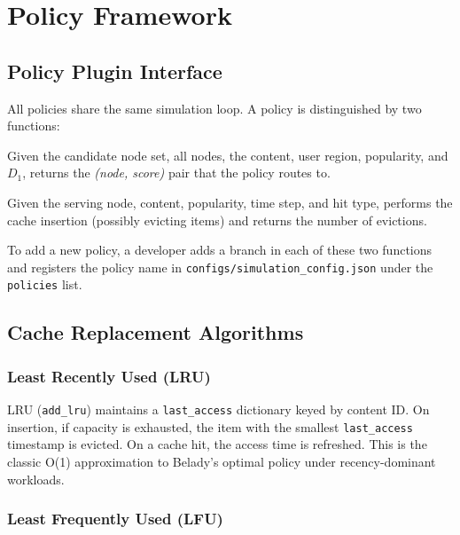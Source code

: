 \documentclass[12pt]{article}
\begin{document}
\section{Policy Framework}
\label{sec:policies}

\subsection{Policy Plugin Interface}

All policies share the same simulation loop. A policy is distinguished by two functions:

\begin{description}[noitemsep]
  \item[\texttt{\_select\_node}] Given the candidate node set, all nodes, the content, user region, popularity, and $D_1$, returns the \emph{(node, score)} pair that the policy routes to.
  \item[\texttt{\_insert\_after\_serve}] Given the serving node, content, popularity, time step, and hit type, performs the cache insertion (possibly evicting items) and returns the number of evictions.
\end{description}

To add a new policy, a developer adds a branch in each of these two functions and registers the policy name in \texttt{configs/simulation\_config.json} under the \texttt{policies} list.

\subsection{Cache Replacement Algorithms}

\subsubsection{Least Recently Used (LRU)}

LRU (\texttt{add\_lru}) maintains a \texttt{last\_access} dictionary keyed by content ID. On insertion, if capacity is exhausted, the item with the smallest \texttt{last\_access} timestamp is evicted. On a cache hit, the access time is refreshed. This is the classic O(1) approximation to Belady's optimal policy under recency-dominant workloads.

\subsubsection{Least Frequently Used (LFU)}
\end{document}
